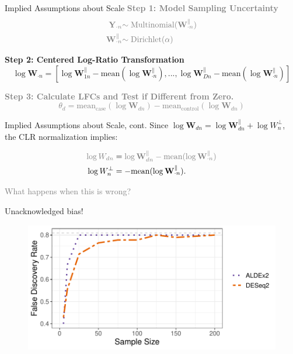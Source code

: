 \documentclass[
  ignorenonframetext,
]{beamer}
\begin{document}
\begin{frame}{Implied Assumptions about Scale}
\protect\hypertarget{implied-assumptions-about-scale}{}
\textcolor{gray}{\textbf{Step 1: Model Sampling Uncertainty}}
\begin{align*}
\textcolor{gray}{\mathbf{Y}_{\cdot n}} &\textcolor{gray}{\sim \text{Multinomial}(\mathbf{W}_{\cdot n}^\parallel)}\\
\textcolor{gray}{\mathbf{W}_{\cdot n}^\parallel} &\textcolor{gray}{\sim \text{Dirichlet}(\alpha)}
\end{align*}

\textbf{Step 2: Centered Log-Ratio Transformation} \begin{equation*}
\log \mathbf{W}_{\cdot n} = \left[\log \mathbf{W}_{1n}^\parallel - \text{mean}(\log \mathbf{W}_{\cdot n}^\parallel), ..., \log \mathbf{W}_{Dn}^\parallel - \text{mean}(\log \mathbf{W}_{\cdot n}^\parallel) \right]
\end{equation*}

\textcolor{gray}{\textbf{Step 3: Calculate LFCs and Test if Different from Zero.}
\begin{equation*}
\theta_d = \text{mean}_{\text{case}}(\log \mathbf{W}_{dn}) - \text{mean}_{\text{control}}(\log \mathbf{W}_{dn})
\end{equation*}}
\end{frame}

\begin{frame}{Implied Assumptions about Scale, cont.}
\protect\hypertarget{implied-assumptions-about-scale-cont.}{}
Since
\(\log \mathbf{W}_{dn} = \log \mathbf{W}_{dn}^\parallel + \log W_n^\perp\),
the CLR normalization implies:

\begin{align*}
\color{gray}{\log W_{dn}} &= \color{gray}{\log \mathbf{W}_{dn}^\parallel - \text{mean}(\log \mathbf{W}_{\cdot n}^\parallel)}\\
\log W_n^\perp &= -\text{mean}(\log \mathbf{W}_{\cdot n}^\parallel).
\end{align*}

\vspace{.25in}

\textcolor{gray}{What happens when this is wrong?}
\end{frame}

\begin{frame}{Unacknowledged bias!}
\protect\hypertarget{unacknowledged-bias}{}
\begin{figure}
  \centering
  \includegraphics[width=4.5in]{figures/unacknowledged_bias.pdf}
\end{figure}
\end{frame}
\end{document}
